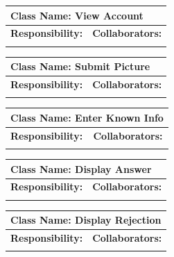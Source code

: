 \documentclass[]{article}
\begin{document}
\begin{itemize}
	\begin{table}
		\centering
		\begin{tabular}{|p{5cm}|p{5cm}|}
		\hline 
		 \multicolumn{2}{|l|}{\textbf{Class Name:} View Account} \\
		\hline
		\textbf{Responsibility:} & \textbf{Collaborators:} \\
		\hline
		\vspace{1in} & \\
		\hline
		\end{tabular}
	\end{table}

	\begin{table}
		\centering
		\begin{tabular}{|p{5cm}|p{5cm}|}
		\hline 
		 \multicolumn{2}{|l|}{\textbf{Class Name:} Submit Picture} \\
		\hline
		\textbf{Responsibility:} & \textbf{Collaborators:} \\
		\hline
		\vspace{1in} & \\
		\hline
		\end{tabular}
	\end{table}

	\begin{table}
		\centering
		\begin{tabular}{|p{5cm}|p{5cm}|}
		\hline 
		 \multicolumn{2}{|l|}{\textbf{Class Name:} Enter Known Info} \\
		\hline
		\textbf{Responsibility:} & \textbf{Collaborators:} \\
		\hline
		\vspace{1in} & \\
		\hline
		\end{tabular}
	\end{table}

	\begin{table}
		\centering
		\begin{tabular}{|p{5cm}|p{5cm}|}
		\hline 
		 \multicolumn{2}{|l|}{\textbf{Class Name:} Display Answer} \\
		\hline
		\textbf{Responsibility:} & \textbf{Collaborators:} \\
		\hline
		\vspace{1in} & \\
		\hline
		\end{tabular}
	\end{table}

	\begin{table}
		\centering
		\begin{tabular}{|p{5cm}|p{5cm}|}
		\hline 
		 \multicolumn{2}{|l|}{\textbf{Class Name:} Display Rejection} \\
		\hline
		\textbf{Responsibility:} & \textbf{Collaborators:} \\
		\hline
		\vspace{1in} & \\
		\hline
		\end{tabular}
	\end{table}

\end{itemize}
\end{document}
